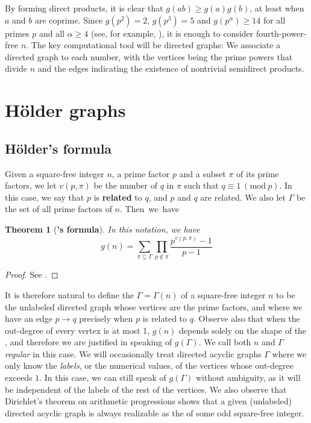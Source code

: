 \documentclass[a4paper, 12pt]{article}
\newcommand{\Mod}[1]{\ (\mathrm{mod} \ #1)}
\theoremstyle{plain}
\newtheorem{thm}{Theorem}[section]
\theoremstyle{definition}
\begin{document}
By forming direct products, it is clear that $g(ab) \ge g(a)g(b)$, at least when $a$ and $b$ are coprime. Since \mbox{$g(p^2) = 2$,} $g(p^3) = 5$ and $g(p^\alpha) \ge 14$ for all primes $p$ and all $\alpha \ge 4$ (see, for example, \cite[Thm.~3.1]{gnumoas}), it is enough to consider fourth-power-free $n$. The key computational tool will be directed graphs: We associate a directed graph to each number, with the vertices being the prime powers that divide $n$ and the edges indicating the existence of nontrivial semidirect products.

\section{Hölder graphs}
\subsection{Hölder's formula}
Given a square-free integer $n$, a prime factor $p$ and a subset $\pi$ of its prime factors, we let $v(p, \pi)$ be the number of $q$ in $\pi$ such that $q \equiv 1 \Mod{p}$. In this case, we say that $p$ is \textbf{related} to $q$, and $p$ and $q$ are related. We also let $\Gamma$ be the set of all prime factors of $n$. \mbox{Then we have}
\begin{thm}[\textbf{'s formula}] In this notation, we have
	\begin{equation*}
		g(n) = \sum_{\pi \subseteq \Gamma} \prod_{p \notin \pi} \frac{p^{v(p, \pi)} - 1}{p - 1}
	\end{equation*}
\end{thm}
\begin{proof} See {\cite[Thm.~5.1]{gnumoas}}. \end{proof}

It is therefore natural to define the \emph{} $\Gamma = \Gamma(n)$ of a square-free integer $n$ to be the unlabeled directed graph whose vertices are the prime factors, and where we have an edge $p \rightarrow q$ precisely when $p$ is related to $q$. Observe also that when the out-degree of every vertex is at most 1, $g(n)$ depends solely on the shape of the , and therefore we are justified in speaking of $g(\Gamma).$ We call both $n$ and $\Gamma$ \emph{regular} in this case. We will occasionally treat directed acyclic graphs $\Gamma$ where we only know the \emph{labels}, or the numerical values, of the vertices whose out-degree exceeds $1$. In this case, we can still speak of $g(\Gamma)$ without ambiguity, as it will be independent of the labels of the rest of the vertices. We also observe that Dirichlet's theorem on arithmetic progressions shows that a given (unlabeled) directed acyclic graph is always realizable as the  of some odd square-free integer.
\end{document}

